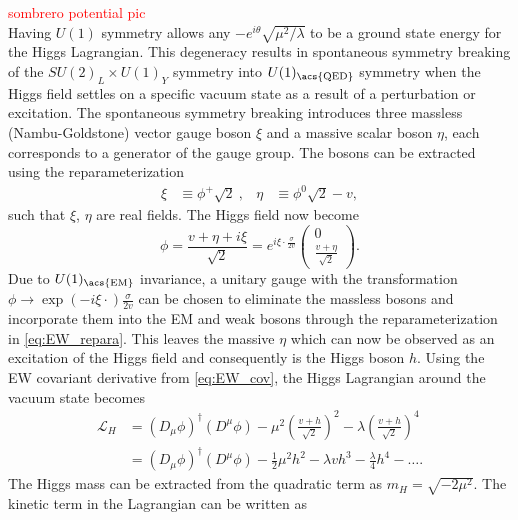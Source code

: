 \documentclass[../thesis.tex]{subfiles}
\begin{document}
\textcolor{red}{sombrero potential pic}\\
Having $U(1)$ symmetry allows any $-e^{i\theta}\sqrt{\mu^2/\lambda}$ to be a ground state energy for the Higgs Lagrangian. This degeneracy results in spontaneous symmetry breaking of the $SU(2)_L\times U(1)_Y$ symmetry into $U(1)_\text{\acs{QED}}$ symmetry when the Higgs field settles on a specific vacuum state as a result of a perturbation or excitation. The spontaneous symmetry breaking introduces three massless (Nambu-Goldstone) vector gauge boson $\xi$ and a massive scalar boson $\eta$, each corresponds to a generator of the gauge group. The bosons can be extracted using the reparameterization \citep{theory:higgs_physics}
\begin{align}
\xi  &\equiv \phi^+\sqrt{2}
\  ,&
\eta &\equiv \phi^0\sqrt{2}-v,
\end{align}
such that $\xi$, $\eta$ are real fields. The Higgs field now become
\begin{equation}
\phi=\frac{v+\eta+i\xi}{\sqrt{2}}=e^{i\xi\cdot\displaystyle\frac{\sigma}{2v}}
\begin{pmatrix}
0 \\ \displaystyle\frac{v+\eta}{\sqrt{2}}
\end{pmatrix}.
\end{equation}
Due to $U(1)_\text{\acs{EM}}$ invariance, a unitary gauge with the transformation $\phi \rightarrow \exp(-i\xi\cdot)\frac{\sigma}{2v}$ can be chosen to eliminate the massless bosons and incorporate them into the \acs{EM} and weak bosons through the reparameterization in \autoref{eq:EW_repara}. This leaves the massive $\eta$ which can now be observed as an excitation of the Higgs field and consequently is the Higgs boson $h$. Using the \acs{EW} covariant derivative from \autoref{eq:EW_cov}, the Higgs Lagrangian around the vacuum state becomes
\begin{equation}
\begin{aligned}
\mathcal{L}_H &= \left(D_\mu\phi\right)^\dagger \left(D^\mu\phi\right) - \mu^2\left(\displaystyle\frac{v+h}{\sqrt{2}}\right)^2-\lambda\left(\displaystyle\frac{v+h}{\sqrt{2}}\right)^4 \\
&= \left(D_\mu\phi\right)^\dagger \left(D^\mu\phi\right) - \frac{1}{2}\mu^2h^2 - \lambda v h^3 - \frac{\lambda}{4} h^4 - \ldots.
\end{aligned}
\end{equation}
The Higgs mass can be extracted from the quadratic term as $m_H = \sqrt{-2\mu^2}$. The kinetic term in the Lagrangian can be written as
\end{document}
